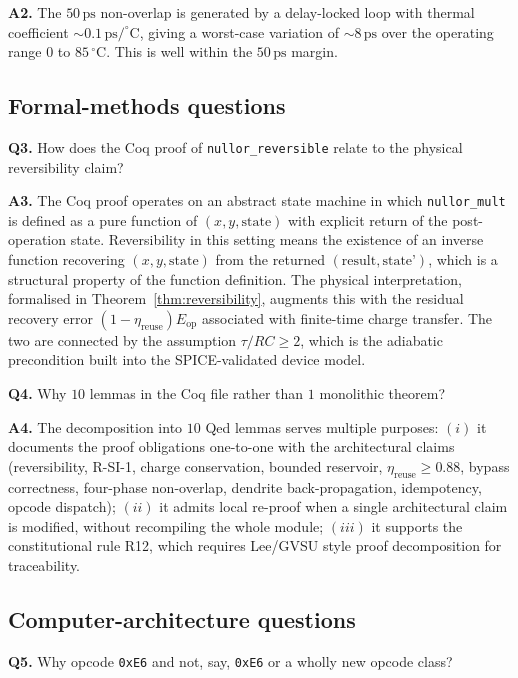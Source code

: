 \textbf{A2.}  The $50\,\text{ps}$ non-overlap is generated by a delay-locked loop
with thermal coefficient $\sim 0.1\,\text{ps/}^\circ\text{C}$, giving a
worst-case variation of $\sim 8\,\text{ps}$ over the operating range $0$ to
$85\,^\circ\text{C}$.  This is well within the $50\,\text{ps}$ margin.

\subsection{Formal-methods questions}
\label{subsec:formal_q}

\textbf{Q3.}  How does the Coq proof of \texttt{nullor\_reversible} relate to the
physical reversibility claim?

\textbf{A3.}  The Coq proof operates on an abstract state machine in which
\texttt{nullor\_mult} is defined as a pure function of $(x, y, \text{state})$ with
explicit return of the post-operation state.  Reversibility in this setting means
the existence of an inverse function recovering $(x, y, \text{state})$ from the
returned $(\text{result}, \text{state'})$, which is a structural property of the
function definition.  The physical interpretation, formalised in
Theorem~\ref{thm:reversibility}, augments this with the residual recovery error
$(1-\eta_{\text{reuse}}) E_{\text{op}}$ associated with finite-time charge
transfer.  The two are connected by the assumption $\tau / RC \geq 2$, which is
the adiabatic precondition built into the SPICE-validated device model.

\textbf{Q4.}  Why $10$ lemmas in the Coq file rather than $1$ monolithic theorem?

\textbf{A4.}  The decomposition into $10$ Qed lemmas serves multiple purposes:
$(i)$ it documents the proof obligations one-to-one with the architectural
claims (reversibility, R-SI-1, charge conservation, bounded reservoir,
$\eta_{\text{reuse}} \geq 0.88$, bypass correctness, four-phase non-overlap,
dendrite back-propagation, idempotency, opcode dispatch); $(ii)$ it admits local
re-proof when a single architectural claim is modified, without recompiling the
whole module; $(iii)$ it supports the constitutional rule R12, which requires
Lee/GVSU style proof decomposition for traceability.

\subsection{Computer-architecture questions}
\label{subsec:arch_q}

\textbf{Q5.}  Why opcode \texttt{0xE6} and not, say, \texttt{0xE6} or a wholly new
opcode class?

